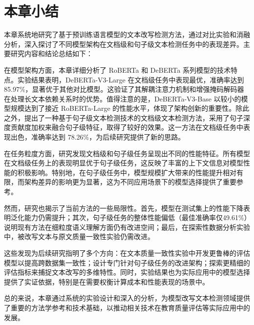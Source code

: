 \section{本章小结}
\label{sec:method-conclusion}

本章系统地研究了基于预训练语言模型的文本改写检测方法，通过对比实验和消融分析，深入探讨了不同模型架构在文档级和句子级文本检测任务中的表现差异。主要研究内容和结论总结如下：

在模型架构方面，本章详细分析了 RoBERTa 和 DeBERTa 系列模型的技术特点。实验结果表明，DeBERTa-V3-Large 在文档级任务中表现最优，准确率达到 85.97\%，显著优于其他对比模型。这验证了其解耦注意力机制和增强掩码解码器在处理长文本依赖关系时的优势。值得注意的是，DeBERTa-V3-Base 以较小的模型规模达到了接近 RoBERTa-Large 的性能水平，体现了架构创新的重要性。除此之外，提出了一种基于句子级文本检测技术的文档级文本检测方法，采用了句子深度贡献度加权来融合句子级特征，取得了较好的效果。这一方法在文档级任务中表现出色，准确率达到 78.26\%，为后续研究提供了新的思路。

在任务粒度方面，研究发现文档级和句子级任务呈现出不同的性能特征。所有模型在文档级任务上的表现明显优于句子级任务，这反映了丰富的上下文信息对模型性能的积极影响。特别地，在句子级任务中，模型规模扩大带来的性能提升相对有限，而架构差异的影响更为显著，这为不同应用场景下的模型选择提供了重要参考。

然而，研究也揭示了当前方法的一些局限性。首先，模型在测试集上的性能下降表明泛化能力仍需提升；其次，句子级任务的整体性能偏低（最佳准确率仅49.61\%）说明现有方法在细粒度语义理解方面仍有改进空间；最后，在探索性数据分析实验中，被改写文本与原文质量一致性实验仍需改进。

这些发现为后续研究指明了多个方向：在文本质量一致性实验中开发更鲁棒的评估模型以提高跨数据集一致性；设计专门针对句子级任务的改进架构；探索更精细的评估指标来捕捉文本改写的多维特性。同时，实验结果也为实际应用中的模型选择提供了实证依据，特别是在需要权衡计算成本和性能表现的场景中。

总的来说，本章通过系统的实验设计和深入的分析，为模型改写文本检测领域提供了重要的方法学参考和技术基础，以推动相关技术在教育质量评估等实际应用中的发展。